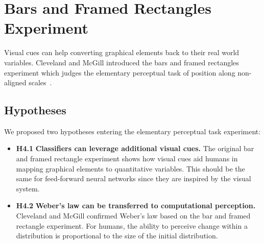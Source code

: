 \section{Bars and Framed Rectangles Experiment}

Visual cues can help converting graphical elements back to their real world variables. Cleveland and McGill introduced the bars and framed rectangles experiment which judges the elementary perceptual task of position along non-aligned scales~\cite{cleveland_mcgill}. 

\subsection{Hypotheses}

We proposed two hypotheses entering the elementary perceptual task experiment:

\begin{itemize}
	\item \textbf{H4.1} \textbf{Classifiers can leverage additional visual cues.} The original bar and framed rectangle experiment shows how visual cues aid humans in mapping graphical elements to quantitative variables. This should be the same for feed-forward neural networks since they are inspired by the visual system.
	\item \textbf{H4.2} \textbf{Weber's law can be transferred to computational perception.} Cleveland and McGill confirmed Weber's law based on the bar and framed rectangle experiment. For humans, the ability to perceive change within a distribution is proportional to the size of the initial distribution.
\end{itemize}

